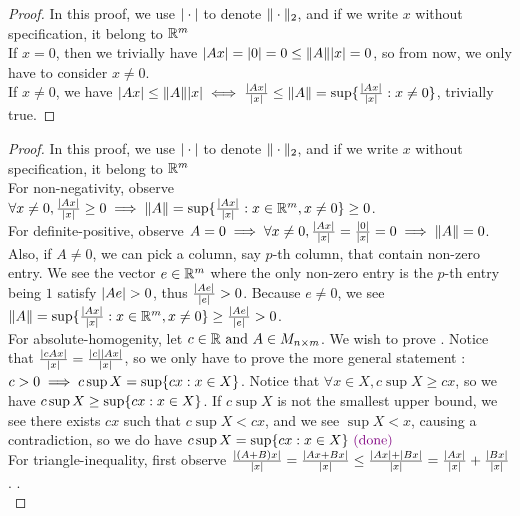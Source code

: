\documentclass{report}
\begin{document}
\begin{proof}
In this proof, we use $|\cdot|$ to denote $\| \cdot \|_2$, and if we write $x$ without specification, it belong to  $\mathbb{R}^m$\\

If $x=0$, then we trivially have  $|Ax|=|0|=0\leq \| A \||x|=0$, so from now, we only have to consider $x\neq 0$.\\

If $x\neq 0$, we have $|Ax|\leq \| A \||x|\iff \frac{|Ax|}{|x|}\leq \| A \|=\sup \{ \frac{|Ax|}{|x|}:x\neq 0 \}$, trivially true.
\end{proof}
\begin{proof}
In this proof, we use $|\cdot|$ to denote $\| \cdot \|_2$, and if we write $x$ without specification, it belong to  $\mathbb{R}^m$\\

For non-negativity, observe $\forall x\neq 0,\frac{|Ax|}{|x|}\geq 0 \implies \| A \|=\sup \{ \frac{|Ax|}{|x|}:x \in \mathbb{R}^m, x\neq 0 \}\geq 0$.\\

For definite-positive, observe $A=0\implies \forall x\neq 0, \frac{|Ax|}{|x|}=\frac{|0|}{|x|}=0\implies \| A \|=0$. Also, if $A\neq 0$, we can pick a column, say $p$-th column, that contain non-zero entry. We see the vector $e\in \mathbb{R}^m$ where the only non-zero entry is the  $p$-th entry being $1$ satisfy $\abso{Ae}>0$, thus $\frac{|Ae|}{|e|}>0$. Because $e\neq 0$, we see $\| A \|=\sup \{ \frac{|Ax|}{|x|}:x\in\mathbb{R}^m,x\neq 0 \}\geq \frac{|Ae|}{|e|}>0$.\\

For absolute-homogenity, let $c \in \mathbb{R}\text{ and }A\in M_{n\times m}$. We wish to prove . Notice that $\frac{|cAx|}{|x|}=\frac{|c||Ax|}{|x|}$, so we only have to prove the more general statement : $c>0 \implies c \sup X= \sup \{ cx:x\in X \}$. Notice that $\forall x \in X, c \sup X\geq cx$, so we have $c\sup X\geq \sup \{ cx:x\in X \}$. If $c\sup X$ is not the smallest upper bound, we see there exists $cx$ such that $c\sup X<cx$, and we see $\sup X<x$, causing a contradiction, so we do have $c\sup X=\sup \{ cx:x\in X \}\textcolor{violet}{\text{ (done) }}$   \\

For triangle-inequality, first observe $\frac{|(A+B)x|}{|x|}=\frac{|Ax+Bx|}{|x|}\leq \frac{|Ax|+|Bx|}{|x|}=\frac{|Ax|}{|x|}+\frac{|Bx|}{|x|}$. .\\


\end{proof}
\end{document}
